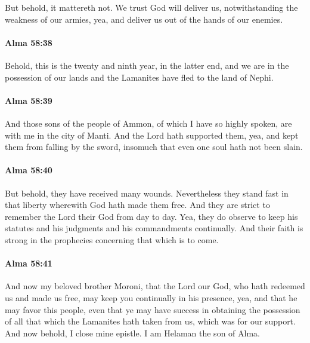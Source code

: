 			But behold, it mattereth not.
			We trust God will deliver us, notwithstanding the weakness of our armies,
			yea, and deliver us out of the hands of our enemies.

		\paragraph{Alma 58:38} %
			\label{ALMA-58-38}

			Behold, this is the twenty and ninth year, in the latter end,
			and we are in the possession of our lands
			and the Lamanites have fled to the land of Nephi.

		\paragraph{Alma 58:39} %
			\label{ALMA-58-39}

			And those sons of the people of Ammon, of which I have so highly spoken,
			are with me in the city of Manti.
			And the Lord hath supported them,
			yea, and kept them from falling by the sword,
			insomuch that even one soul hath not been slain.

		\paragraph{Alma 58:40} %
			\label{ALMA-58-40}

			But behold, they have received many wounds.
			Nevertheless they stand fast in that liberty wherewith God hath made them free.
			And they are strict to remember the Lord their God from day to day.
			Yea, they do observe to keep his statutes
			and his judgments and his commandments continually.
			And their faith is strong in the prophecies concerning that which is to come.

		\paragraph{Alma 58:41} %
			\label{ALMA-58-41}

			And now my beloved brother Moroni,
			that the Lord our God,
			who hath redeemed us and made us free,
			may keep you continually in his presence,
			yea, and that he may favor this people,
			even that ye may have success in obtaining the possession
			of all that which the Lamanites hath taken from us,
			which was for our support.
			And now behold, I close mine epistle.
			I am Helaman the son of Alma.

